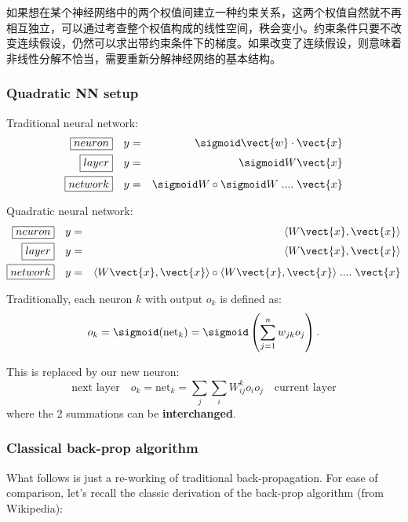 如果想在某个神经网络中的两个权值间建立一种约束关系，这两个权值自然就不再相互独立，可以通过考查整个权值构成的线性空间，秩会变小。约束条件只要不改变连续假设，仍然可以求出带约束条件下的梯度。如果改变了连续假设，则意味着非线性分解不恰当，需要重新分解神经网络的基本结构。

\subsubsection{Quadratic NN setup}

Traditional neural network:
\begin{eqnarray}
\boxed{neuron} \quad & y = & \sigmoid \vect{w} \cdot \vect{x} \nonumber \\
\boxed{layer} \quad & y = & \sigmoid W \vect{x} \nonumber \\
\boxed{network} \quad & y = & \sigmoid W \circ \sigmoid W \; .... \; \vect{x} 
\end{eqnarray}

Quadratic neural network:
\begin{eqnarray}
\boxed{neuron} \quad & y = & \langle W \vect{x}, \vect{x} \rangle \nonumber \\
\boxed{layer} \quad & y = & \langle W \vect{x}, \vect{x} \rangle \nonumber \\
\boxed{network} \quad & y = & \langle W \vect{x}, \vect{x} \rangle \circ \langle W \vect{x}, \vect{x} \rangle \; .... \; \vect{x} 
\end{eqnarray}

Traditionally, each neuron $k$ with output $o_k$ is defined as:
\begin{equation}
o_k = \sigmoid ({\text{net}}_k) = \sigmoid \left(\sum _{j=1}^{n} w_{jk} o_j \right) .
\end{equation}

This is replaced by our new neuron:
\begin{equation}
\boxed{\mbox{next layer}} \quad
o_k = {\text{net}}_k = \sum_j \sum_i W_{ij}^k o_i o_j
\quad \boxed{\mbox{current layer}}
\end{equation}
where the 2 summations can be \textbf{interchanged}.

\subsubsection{Classical back-prop algorithm}

What follows is just a re-working of traditional back-propagation.  For ease of comparison, let's recall the classic derivation of the back-prop algorithm (from Wikipedia):

